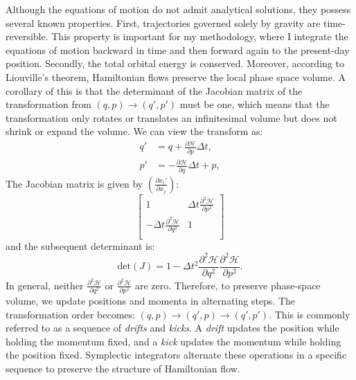     Although the equations of motion do not admit analytical solutions, they possess several known properties. First, trajectories governed solely by gravity are time-reversible. This property is important for my methodology, where I integrate the equations of motion backward in time and then forward again to the present-day position. Secondly, the total orbital energy is conserved. Moreover, according to Liouville's theorem, Hamiltonian flows preserve the local phase space volume. A corollary of this is that the determinant of the Jacobian matrix of the transformation from $\left(q,p\right)\rightarrow \left(q',p'\right)$ must be one, which means that the transformation only rotates or translates an infinitesimal volume but does not shrink or expand the volume. We can view the transform as: 
    \begin{eqnarray}
        q' &= q + \frac{\partial \mathcal{H}}{\partial p}\Delta t, \\
        p' &= -\frac{\partial \mathcal{H}}{\partial q}\Delta t + p,
    \end{eqnarray}
    The Jacobian matrix is given by $\left(\frac{\partial x_i'}{\partial x_j }\right)$: 
    \begin{equation}
        \begin{bmatrix}
            1 & \Delta t \frac{\partial^2 \mathcal{H}}{\partial p^2} \\  
            -\Delta t \frac{\partial^2 \mathcal{H}}{\partial q^2} & 1 \\  
        \end{bmatrix}
    \end{equation}
    and the subsequent determinant is: 
    \begin{equation}
        \mathrm{det}\left(J\right) = 1 - \Delta t^2 \frac{\partial^2 \mathcal{H}}{\partial q^2} \frac{\partial^2 \mathcal{H}}{\partial p^2}.
    \end{equation}
    In general, neither $\frac{\partial^2 \mathcal{H}}{\partial q^2}$ or $\frac{\partial^2 \mathcal{H}}{\partial p^2}$ are zero. Therefore, to preserve phase-space volume, we update positions and momenta in alternating steps. The transformation order becomes: $(q,p) \rightarrow (q',p) \rightarrow (q',p')$. This is commonly referred to as a sequence of \textit{drifts} and \textit{kicks}. A \textit{drift} updates the position while holding the momentum fixed, and a \textit{kick} updates the momentum while holding the position fixed. Symplectic integrators alternate these operations in a specific sequence to preserve the structure of Hamiltonian flow.

